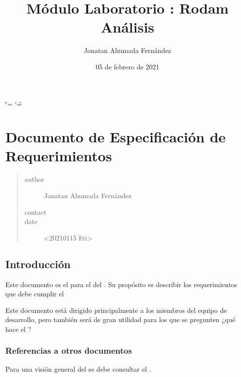 \documentclass[letterpaper,10pt,spanish]{sphinxmanual}
\title{Módulo Laboratorio : Rodam Análisis}
\date{05 de febrero de 2021}
\author{Jonatan Ahumada Fernández}
\begin{document}
\ifdefined\shorthandoff
  \ifnum\catcode`\=\string=\active\shorthandoff{=}\fi
  \ifnum\catcode`\"=\active{}\fi
\fi

\pagestyle{empty}
\sphinxmaketitle
\pagestyle{plain}
\sphinxtableofcontents
\pagestyle{normal}
\label{\detokenize{index::doc}}



\chapter{Documento de Especificación de Requerimientos}
\label{\detokenize{requerimientos/srs:documento-de-especificacion-de-requerimientos}}\label{\detokenize{requerimientos/srs::doc}}\begin{quote}\begin{description}
\item[{author}] \leavevmode
Jonatan Ahumada Fernández

\item[{contact}] \leavevmode
{}

\item[{date}] \leavevmode
\textless{}2021\sphinxhyphen{}01\sphinxhyphen{}15 Fri\textgreater{}

\end{description}\end{quote}


\section{Introducción}
\label{\detokenize{requerimientos/srs:introduccion}}
Este documento es el  para el  del
. Su propósito
es describir los requerimientos que debe cumplir el 

Este documento está dirigido principalmente a los miembros del equipo
de desarrollo, pero también será de gran utilidad para los 
que se pregunten ¿qué hace el ?


\subsection{Referencias a otros documentos}
\label{\detokenize{requerimientos/srs:referencias-a-otros-documentos}}
Para una visión general del  se debe consultar el .
\end{document}
